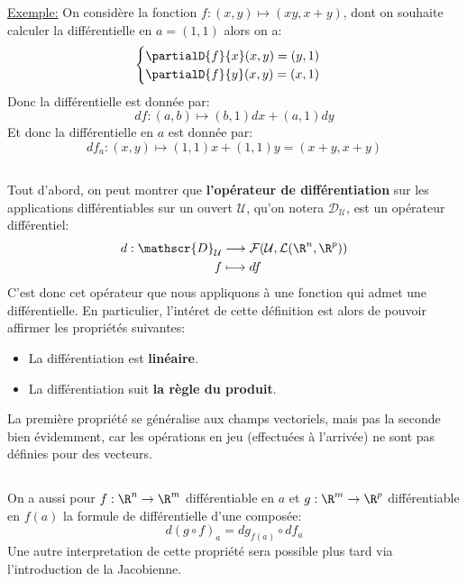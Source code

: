 \underline{Exemple:} On considère la fonction \(f : (x, y) \mapsto (xy, x + y)\), dont on souhaite calculer la différentielle en \(a = (1, 1)\) alors on a:
\[
   \begin{cases}
      \partialD{f}{x}(x, y) = (y, 1)\\
      \partialD{f}{y}(x, y) = (x, 1)
   \end{cases}   
\]
Donc la différentielle est donnée par:
\[
   df : (a, b) \mapsto (b, 1)dx + (a, 1)dy
\]
Et donc la différentielle en \(a\) est donnée par:
\[
   df_a : (x, y) \mapsto (1, 1)x + (1, 1)y = (x + y, x + y)
\]

\subsection*{}
Tout d'abord, on peut montrer que \textbf{l'opérateur de différentiation} sur les applications différentiables sur un ouvert \(\mathcal{U}\), qu'on notera \(\mathscr{D}_\mathcal{U}\), est un opérateur différentiel:
\[
   \begin{aligned}
      d : \mathscr{D}_\mathcal{U} &\longrightarrow \mathcal{F}(\mathcal{U}, \mathcal{L}(\R^n, \R^p))\\
      f &\longmapsto df
   \end{aligned}
\]
C'est donc cet opérateur que nous appliquons à une fonction qui admet une différentielle. En particulier, l'intéret de cette définition est alors de pouvoir affirmer les propriétés suivantes:
\begin{itemize}
   \item La différentiation est \textbf{linéaire}.
   \item La différentiation suit \textbf{la règle du produit}.
\end{itemize}
La première propriété se généralise aux champs vectoriels, mais pas la seconde bien évidemment, car les opérations en jeu (effectuées à l'arrivée) ne sont pas définies pour des vecteurs.

\subsection*{}
On a aussi pour \(f : \R^n \rightarrow \R^m\) différentiable en \(a\) et \(g : \R^m \rightarrow \R^p\) différentiable en \(f(a)\) la formule de différentielle d'une composée:
\[
   d(g \circ f)_a = dg_{f(a)} \circ df_a   
\]
Une autre interpretation de cette propriété sera possible plus tard via l'introduction de la Jacobienne.

